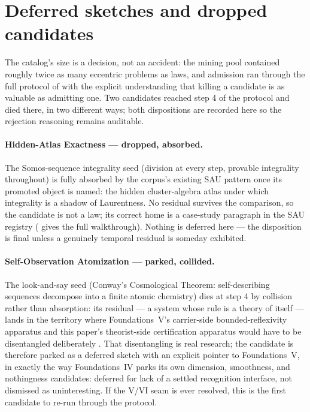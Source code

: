 \documentclass[11pt]{article}
\newcommand{\FoundIV}{Foundations~IV}
\theoremstyle{definition}
\begin{document}
 \section{Deferred sketches and dropped candidates}\label{sec:sketches}

The catalog's size is a decision, not an accident: the mining pool contained roughly twice as many
eccentric problems as laws, and admission ran through the full protocol of 
with the explicit understanding that killing a candidate is as valuable as admitting one. Two
candidates reached step 4 of the protocol and died there, in two different ways; both dispositions
are recorded here so the rejection reasoning remains auditable.

\paragraph{Hidden-Atlas Exactness --- dropped, absorbed.} The Somos-sequence integrality seed
(division at every step, provable integrality throughout) is fully absorbed by the corpus's existing
SAU pattern once its promoted object is named: the hidden cluster-algebra atlas under which
integrality is a shadow of Laurentness. No residual survives the comparison, so the candidate is not
a law; its correct home is a case-study paragraph in the SAU registry
( gives the full walkthrough). Nothing is deferred here --- the disposition is
final unless a genuinely temporal residual is someday exhibited.

\paragraph{Self-Observation Atomization --- parked, collided.} The look-and-say seed (Conway's
Cosmological Theorem: self-describing sequences decompose into a finite atomic chemistry) dies at
step 4 by collision rather than absorption: its residual --- a system whose rule is a theory of
itself --- lands in the territory where Foundations~V's carrier-side bounded-reflexivity apparatus
and this paper's theorist-side certification apparatus would have to be disentangled deliberately
\citep{FoundationsVCognition}. That disentangling is real research; the candidate is therefore
parked as a deferred sketch with an explicit pointer to Foundations~V, in exactly the way
\FoundIV{} parks its own dimension, smoothness, and nothingness candidates: deferred for lack of a
settled recognition interface, not dismissed as uninteresting. If the V/VI seam is ever resolved,
this is the first candidate to re-run through the protocol.
\end{document}
